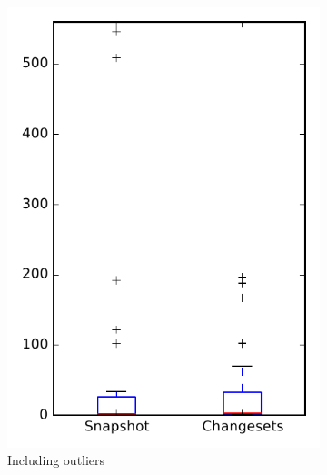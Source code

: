 
\begin{figure}
    \centering
    \begin{subfigure}{.4\textwidth}
        \centering
        \includegraphics[height=0.4\textheight]{figures/flt/rq1_tika}
        \caption{Including outliers}\label{fig:flt:rq1:tika_outlier}
    \end{subfigure}%
    \begin{subfigure}{.4\textwidth}
        \centering

\end{subfigure}
\end{figure}
